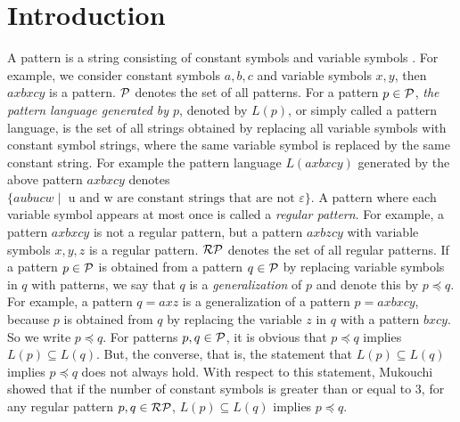 \section{Introduction}

A pattern is a string consisting of constant symbols and variable symbols \cite{Angluin1980a}.
For example, we consider constant symbols $a,b,c$ and variable symbols $x,y$,  then $axbxcy$ is a pattern.
$\mathcal{P}$ denotes the set of all patterns.
For a pattern $p\in \mathcal{P}$, {\it the pattern language generated by $p$}, denoted by $L(p)$, or simply called a pattern language, is the set of all strings obtained by replacing all variable symbols with constant symbol strings, where the same variable symbol is replaced by the same constant string.
For example the pattern language $L(axbxcy)$ generated by the above pattern $axbxcy$ denotes $\{ aubucw \mid \mbox{  u and w are constant strings that are not $\varepsilon$} \}$.
A pattern where each variable symbol appears at most once is called a {\it regular pattern}. 
For example, a pattern $axbxcy$ is not a regular pattern, but a pattern $axbzcy$ with variable symbols $x,y,z$ is a regular pattern.
$\mathcal{RP}$ denotes the set of all regular patterns.
If a pattern $p\in \mathcal{P}$ is obtained from a pattern $q\in\mathcal{P}$ by replacing variable symbols in $q$ with patterns, we say that $q$ is a {\it generalization} of $p$ and denote this by $p\preceq q$.
For example, a pattern $q=axz$ is a generalization of a pattern $p=axbxcy$, because $p$ is obtained from $q$ by replacing the variable $z$ in $q$ with a pattern $bxcy$.
So we write $p\preceq q$.
For patterns $p,q\in \mathcal{P}$, it is obvious that $p\preceq q$ implies $L(p)\subseteq L(q)$.
But, the converse, that is, the statement that  $L(p)\subseteq L(q)$ implies $p\preceq q$ does not always hold.
With respect to this statement, Mukouchi\cite{Mukouchi1991} showed that if the number of constant symbols is greater than or equal to 3, for any regular pattern $p,q\in \mathcal{RP}$, $L(p)\subseteq L(q)$ implies $p\preceq q$.

